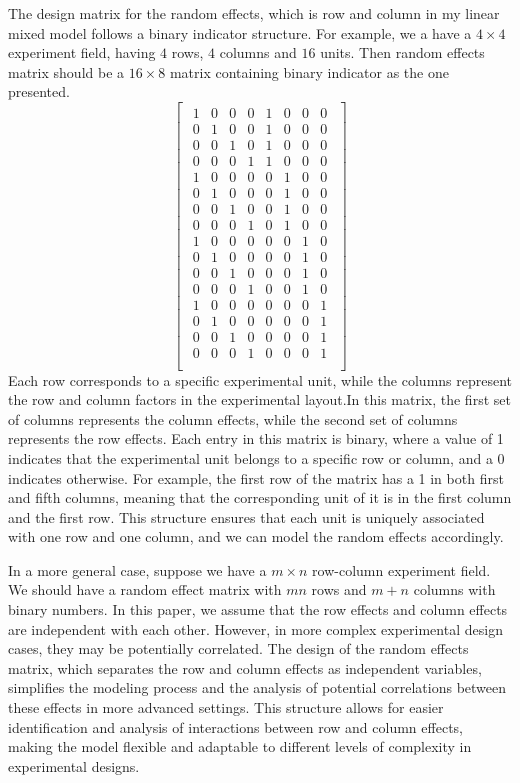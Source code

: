 \documentclass[
  a4paper,
  oneside,
  openany,
  12pt,
  onecolumn]{book}
\theoremstyle{plain}
\theoremstyle{definition}
\theoremstyle{remark}
\begin{document}
The design matrix for the random effects, which is row and column in my
linear mixed model follows a binary indicator structure. For example, we
a have a \(4\times 4\) experiment field, having \(4\) rows, \(4\)
columns and \(16\) units. Then random effects matrix should be a
\(16 \times 8\) matrix containing binary indicator as the one presented.
\[
\begin{bmatrix}
\begin{array}{cccc|cccc}
1 & 0 & 0 & 0 & 1 & 0 & 0 & 0 \\
0 & 1 & 0 & 0 & 1 & 0 & 0 & 0 \\
0 & 0 & 1 & 0 & 1 & 0 & 0 & 0 \\
0 & 0 & 0 & 1 & 1 & 0 & 0 & 0 \\
1 & 0 & 0 & 0 & 0 & 1 & 0 & 0 \\
0 & 1 & 0 & 0 & 0 & 1 & 0 & 0 \\
0 & 0 & 1 & 0 & 0 & 1 & 0 & 0 \\
0 & 0 & 0 & 1 & 0 & 1 & 0 & 0 \\
1 & 0 & 0 & 0 & 0 & 0 & 1 & 0 \\
0 & 1 & 0 & 0 & 0 & 0 & 1 & 0 \\
0 & 0 & 1 & 0 & 0 & 0 & 1 & 0 \\
0 & 0 & 0 & 1 & 0 & 0 & 1 & 0 \\
1 & 0 & 0 & 0 & 0 & 0 & 0 & 1 \\
0 & 1 & 0 & 0 & 0 & 0 & 0 & 1 \\
0 & 0 & 1 & 0 & 0 & 0 & 0 & 1 \\
0 & 0 & 0 & 1 & 0 & 0 & 0 & 1 \\
\end{array}
\end{bmatrix}
\] Each row corresponds to a specific experimental unit, while the
columns represent the row and column factors in the experimental
layout.In this matrix, the first set of columns represents the column
effects, while the second set of columns represents the row effects.
Each entry in this matrix is binary, where a value of 1 indicates that
the experimental unit belongs to a specific row or column, and a 0
indicates otherwise. For example, the first row of the matrix has a 1 in
both first and fifth columns, meaning that the corresponding unit of it
is in the first column and the first row. This structure ensures that
each unit is uniquely associated with one row and one column, and we can
model the random effects accordingly.

In a more general case, suppose we have a \(m\times n\) row-column
experiment field. We should have a random effect matrix with \(mn\) rows
and \(m+n\) columns with binary numbers. In this paper, we assume that
the row effects and column effects are independent with each other.
However, in more complex experimental design cases, they may be
potentially correlated. The design of the random effects matrix, which
separates the row and column effects as independent variables,
simplifies the modeling process and the analysis of potential
correlations between these effects in more advanced settings. This
structure allows for easier identification and analysis of interactions
between row and column effects, making the model flexible and adaptable
to different levels of complexity in experimental designs.
\end{document}
